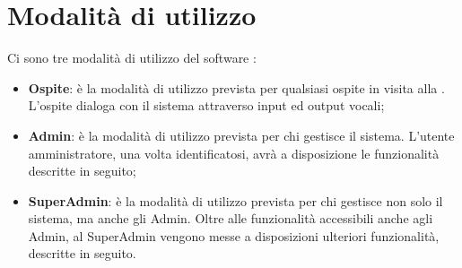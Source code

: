 \documentclass[../ManualeSviluppatore_v2.0.0.tex]{subfiles}
\begin{document}
\section{Modalità di utilizzo}

	Ci sono tre modalità di utilizzo del software \atavi:
	\begin{itemize}
		\item{\textbf{Ospite}: è la modalità di utilizzo prevista per qualsiasi ospite in visita alla \prop. L'ospite dialoga con il sistema attraverso input ed output vocali;}
		\item{\textbf{\gls{Admin}}: è la modalità di utilizzo prevista per chi gestisce il sistema. L'utente amministratore, una volta identificatosi, avrà a disposizione le funzionalità descritte in seguito;}
		\item{\textbf{\gls{SuperAdmin}}: è la modalità di utilizzo prevista per chi gestisce non solo il sistema, ma anche gli Admin. Oltre alle funzionalità accessibili anche agli Admin, al SuperAdmin vengono messe a disposizioni ulteriori funzionalità, descritte in seguito.}
	\end{itemize}
	
\end{document}
